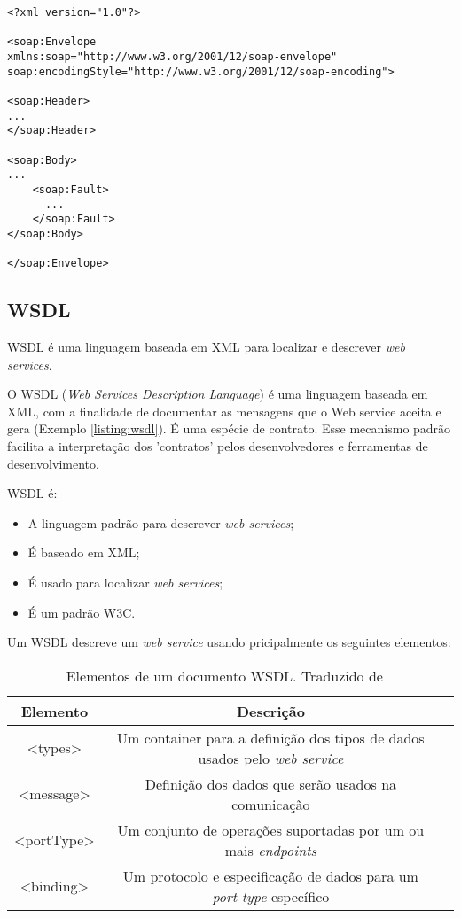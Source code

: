 \lstset{language=XML}
\begin{lstlisting}[caption={Estrutura de uma mensagem SOAP},frame=trBL,breaklines=true,label=listing:msgsoap]
<?xml version="1.0"?>

<soap:Envelope
xmlns:soap="http://www.w3.org/2001/12/soap-envelope"
soap:encodingStyle="http://www.w3.org/2001/12/soap-encoding">

<soap:Header>
...
</soap:Header>

<soap:Body>
...  
	<soap:Fault>
	  ...  
	</soap:Fault>
</soap:Body>

</soap:Envelope>
\end{lstlisting}

\subsection{WSDL}

WSDL é uma linguagem baseada em XML para localizar e descrever \textit{web services}.

O WSDL (\textit{Web Services Description Language}) é uma linguagem baseada em XML, com a finalidade de documentar as mensagens que o Web service aceita e gera (Exemplo \ref{listing:wsdl}). É uma espécie de contrato. Esse mecanismo padrão facilita a interpretação dos 'contratos' pelos desenvolvedores e ferramentas de desenvolvimento. 

WSDL é:

\begin {itemize}
	\item A linguagem padrão para descrever \textit{web services};
	\item É baseado em XML;
	\item É usado para localizar \textit{web services};
	\item É um padrão W3C.
\end {itemize}

Um WSDL descreve um \textit{web service} usando pricipalmente os seguintes elementos:

\begin{table}[h]
	\caption{Elementos de um documento WSDL. Traduzido de ~\cite{w3cs}}
	\begin{center}
	\begin{tabular}{ccc}
		\hline
			\textbf{Elemento} & \textbf{Descrição} \\
		\hline
			<types> & Um container para a definição dos tipos de dados usados pelo \textit{web service}\\
			<message> & Definição dos dados que serão usados na comunicação \\
			<portType> & Um conjunto de operações suportadas por um ou mais \textit{endpoints} \\
			<binding> & Um protocolo e especificação de dados para um \textit{port type} específico\\
		\hline
	\end {tabular}
	\end{center}
	\label{tab:elementosWsdl}
\end{table}

